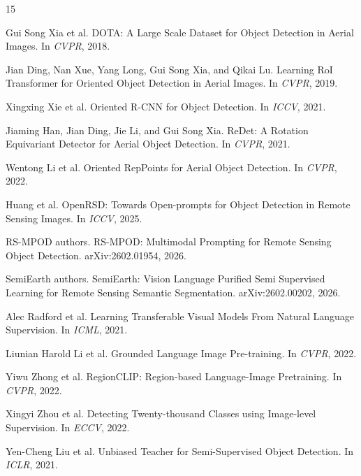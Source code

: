 \documentclass[10pt]{article}
\begin{document}
\begin{thebibliography}{15}

Gui Song Xia et al.
\newblock DOTA: A Large Scale Dataset for Object Detection in Aerial Images.
\newblock In \emph{CVPR}, 2018.

Jian Ding, Nan Xue, Yang Long, Gui Song Xia, and Qikai Lu.
\newblock Learning RoI Transformer for Oriented Object Detection in Aerial Images.
\newblock In \emph{CVPR}, 2019.

Xingxing Xie et al.
\newblock Oriented R-CNN for Object Detection.
\newblock In \emph{ICCV}, 2021.

Jiaming Han, Jian Ding, Jie Li, and Gui Song Xia.
\newblock ReDet: A Rotation Equivariant Detector for Aerial Object Detection.
\newblock In \emph{CVPR}, 2021.

Wentong Li et al.
\newblock Oriented RepPoints for Aerial Object Detection.
\newblock In \emph{CVPR}, 2022.

Huang et al.
\newblock OpenRSD: Towards Open-prompts for Object Detection in Remote Sensing Images.
\newblock In \emph{ICCV}, 2025.

RS-MPOD authors.
\newblock RS-MPOD: Multimodal Prompting for Remote Sensing Object Detection.
\newblock arXiv:2602.01954, 2026.

SemiEarth authors.
\newblock SemiEarth: Vision Language Purified Semi Supervised Learning for Remote Sensing Semantic Segmentation.
\newblock arXiv:2602.00202, 2026.

Alec Radford et al.
\newblock Learning Transferable Visual Models From Natural Language Supervision.
\newblock In \emph{ICML}, 2021.

Liunian Harold Li et al.
\newblock Grounded Language Image Pre-training.
\newblock In \emph{CVPR}, 2022.

Yiwu Zhong et al.
\newblock RegionCLIP: Region-based Language-Image Pretraining.
\newblock In \emph{CVPR}, 2022.

Xingyi Zhou et al.
\newblock Detecting Twenty-thousand Classes using Image-level Supervision.
\newblock In \emph{ECCV}, 2022.

Yen-Cheng Liu et al.
\newblock Unbiased Teacher for Semi-Supervised Object Detection.
\newblock In \emph{ICLR}, 2021.


\end{thebibliography}
\end{document}

